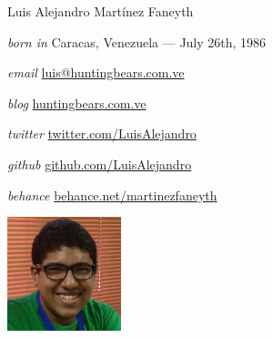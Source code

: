 \documentclass[11pt,letterpaper]{article}
\begin{document}
\begin{cv}{Luis Alejandro Mart\'inez Faneyth}
\vspace{1em}

\begin{minipage}{.7\linewidth}
\begin{cvlist}{}
\item[\textit{\large{born in}}]{Caracas, Venezuela --- July 26th, 1986}
\item[\textit{\large{email}}]{\href{mailto:luis@huntingbears.com.ve}{luis@huntingbears.com.ve}}
\item[\textit{\large{blog}}]{\href{http://huntingbears.com.ve/}{huntingbears.com.ve}}
\item[\textit{\large{twitter}}]{\href{http://twitter.com/LuisAlejandro}{twitter.com/LuisAlejandro}}
\item[\textit{\large{github}}]{\href{http://github.com/LuisAlejandro}{github.com/LuisAlejandro}}
\item[\textit{\large{behance}}]{\href{http://www.behance.net/martinezfaneyth}{behance.net/martinezfaneyth}}
\end{cvlist}
\end{minipage}
\begin{minipage}{.3\linewidth}
\includegraphics{curriculumvitae.jpg}
\end{minipage}
\vspace{1em}


\end{cv}
\end{document}
